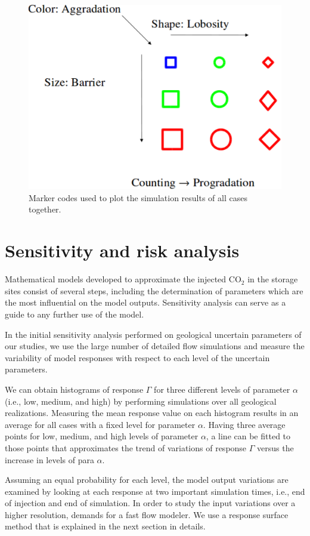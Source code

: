 \begin{figure}
  \centering
  \includegraphics[width=0.65 \linewidth]{./figurer/codes} 
  \caption{Marker codes used to plot the simulation results of all cases
together.}
  \label{fig:codes}
%
\end{figure}

\section{Sensitivity and risk analysis}
\label{sec:StochasticAnalysis}

Mathematical models developed to approximate the injected $\mbox{CO}_{2}$ in the
storage sites consist of several steps, including the determination of
parameters which are the most influential on the model outputs. Sensitivity
analysis can serve as a guide to any further use of the model.

In the initial sensitivity analysis performed on geological uncertain
parameters of our studies, we use the large number of detailed flow
simulations and measure the variability of model responses with respect to each
level of the uncertain parameters.

We can obtain histograms of response $\Gamma$  for three different levels of
parameter $\alpha$ (i.e., low, medium, and high) by performing simulations over
all geological realizations. Measuring the mean response value on
each histogram results in an average for all cases with a fixed level for
parameter $\alpha$. Having three average points for low, medium,
and high levels of parameter $\alpha$, a line can be fitted to those points 
that approximates the trend of variations of response $\Gamma$ versus the
increase in levels of para $\alpha$.

Assuming an equal probability for each level, the model output variations are
examined by looking at each response at two important simulation times, i.e.,
end of injection and end of simulation. In order to study the input variations
over a higher resolution, demands for a fast flow modeler. We use a response 
surface method that is explained in the next section in details. 


